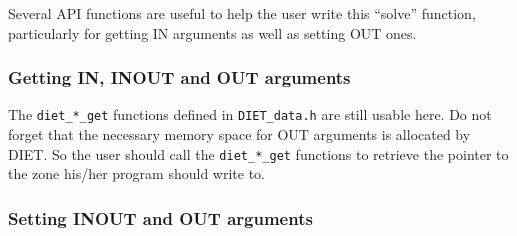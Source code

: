 Several API functions are useful to help the user write this ``solve''
function, particularly for getting IN arguments as well as setting OUT ones.

\subsubsection*{Getting IN, INOUT and OUT arguments}

The \texttt{diet\_*\_get} functions defined in \texttt{DIET\_data.h} are still
usable here. Do not forget that the necessary memory space for OUT arguments is
allocated by DIET. So the user should call the \texttt{diet\_*\_get} functions
to retrieve the pointer to the zone his/her program should write to.

\subsubsection*{Setting INOUT and OUT arguments}


